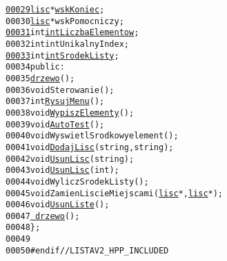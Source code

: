\begin{footnotesize}
\begin{alltt}
\hypertarget{listaV2_8hpp_source_l00029}{}\hyperlink{classdrzewo_af5da627dbc719e872f654ea31105c41f}{00029}         \hyperlink{classdrzewo_1_1lisc}{lisc} *\hyperlink{classdrzewo_af5da627dbc719e872f654ea31105c41f}{wskKoniec};
00030         \hyperlink{classdrzewo_1_1lisc}{lisc} *wskPomocniczy;
\hypertarget{listaV2_8hpp_source_l00031}{}\hyperlink{classdrzewo_a1be4229048eaebb61e07f955596fa27b}{00031}         \textcolor{keywordtype}{int} \hyperlink{classdrzewo_a1be4229048eaebb61e07f955596fa27b}{intLiczbaElementow};
00032         \textcolor{keywordtype}{int} intUnikalnyIndex;
\hypertarget{listaV2_8hpp_source_l00033}{}\hyperlink{classdrzewo_aa1e5d533332e767d70b7feab0f506b0b}{00033}         \textcolor{keywordtype}{int} \hyperlink{classdrzewo_aa1e5d533332e767d70b7feab0f506b0b}{intSrodekListy};
00034     \textcolor{keyword}{public}:
00035         \hyperlink{classdrzewo_a555c14101f8c11cf9344ecf8f8cf87b0}{drzewo}();
00036         \textcolor{keywordtype}{void} Sterowanie();
00037         \textcolor{keywordtype}{int} \hyperlink{classdrzewo_af129795d6fd7898310227906056f6d41}{RysujMenu}();
00038         \textcolor{keywordtype}{void} \hyperlink{classdrzewo_a42f04ceb16b668eb4c326d70753249c1}{WypiszElementy}();
00039         \textcolor{keywordtype}{void} \hyperlink{classdrzewo_a69c8619ac7339ce26f1c092c918c42dc}{AutoTest}();
00040         \textcolor{keywordtype}{void} WyswietlSrodkowyelement();
00041         \textcolor{keywordtype}{void} \hyperlink{classdrzewo_affe40fef12dfebfca7e1b46a73bdbb8d}{DodajLisc}(\textcolor{keywordtype}{string}, \textcolor{keywordtype}{string});
00042         \textcolor{keywordtype}{void} \hyperlink{classdrzewo_a05086f97ce01ade43dc3ff7a441d9f55}{UsunLisc}(\textcolor{keywordtype}{string});
00043         \textcolor{keywordtype}{void} \hyperlink{classdrzewo_a05086f97ce01ade43dc3ff7a441d9f55}{UsunLisc}(\textcolor{keywordtype}{int});
00044         \textcolor{keywordtype}{void} WyliczSrodekListy();
00045         \textcolor{keywordtype}{void} ZamienLiscieMiejscami(\hyperlink{classdrzewo_1_1lisc}{lisc} *,\hyperlink{classdrzewo_1_1lisc}{lisc}*);
00046         \textcolor{keywordtype}{void} \hyperlink{classdrzewo_aae2e7025da136b328c490706677a66b5}{UsunListe}();
00047         \hyperlink{classdrzewo_a5d91af876b63be1f89bd93c9e8745aa7}{~drzewo}();
00048 \};
00049 
00050 \textcolor{preprocessor}{#endif // LISTAV2\_HPP\_INCLUDED}
\end{alltt}\end{footnotesize}
